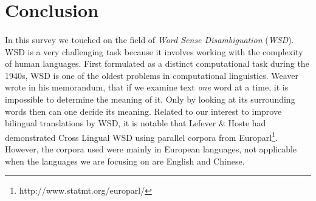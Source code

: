 \documentclass[12 pt]{article}
\begin{document}
\section{Conclusion}
\label{conclusion}
\paragraph{}
In this survey we touched on the field of \textit{Word Sense Disambiguation} (\textit{WSD}). WSD is a very challenging task because it involves working with the complexity of human languages. First formulated as a distinct computational task during the 1940s, WSD is one of the oldest problems in computational linguistics. Weaver \cite{weaver} wrote in his memorandum, that if we examine text \textit{one} word at a time, it is impossible to determine the meaning of it. Only by looking at its surrounding words then can one decide its meaning.
Related to our interest to improve bilingual translations by WSD, it is notable that Lefever \& Hoste \cite{crosslingual} had demonstrated Cross Lingual WSD using parallel corpora from Europarl\footnote{http://www.statmt.org/europarl/}. However, the corpora used were mainly in European languages, not applicable when the languages we are focusing on are English and Chinese.
\end{document}
